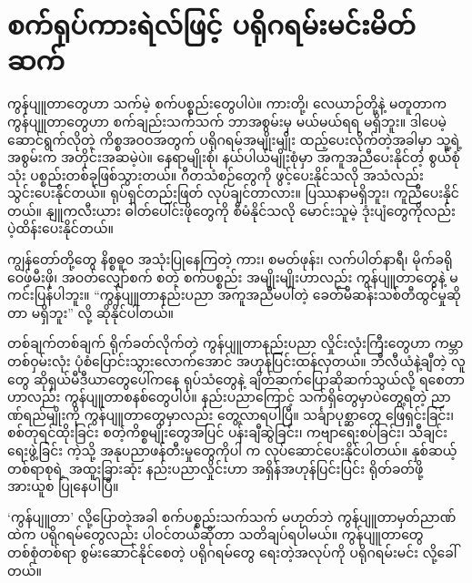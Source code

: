 \chapter{စက်ရုပ်ကားရဲလ်ဖြင့် ပရိုဂရမ်းမင်းမိတ်ဆက်} \label{ch:ch01}
ကွန်ပျူတာတွေဟာ သက်မဲ့ စက်ပစ္စည်းတွေပါပဲ။ ကားတို့၊ လေယာဉ်တို့နဲ့ မတူတာက ကွန်ပျူတာတွေဟာ စက်ချည်းသက်သက် ဘာအစွမ်းမှ မယ်မယ်ရရ မရှိဘူး။ ဒါပေမဲ့ ဆောင်ရွက်လိုတဲ့ ကိစ္စအဝဝအတွက် ပရိုဂရမ်အမျိုးမျိုး ထည့်ပေးလိုက်တဲ့အခါမှာ သူ့ရဲ့အစွမ်းက အတိုင်းအဆမဲ့ပဲ။ နေရာမျိုးစုံ၊ နယ်ပါယ်မျိုးစုံမှာ အကူအညီပေးနိုင်တဲ့ စွယ်စုံသုံး ပစ္စည်းတစ်ခုဖြစ်သွားတယ်။ ဂီတသံစဉ်တွေကို ဖွင့်ပေးနိုင်သလို အသံလည်းသွင်းပေးနိုင်တယ်။ ရုပ်ရှင်တည်းဖြတ် လုပ်ချင်တာလား။ ပြဿနာမရှိဘူး၊ ကူညီပေးနိုင်တယ်။ နျူကလီး\allowbreak ယား ဓါတ်ပေါင်းဖိုတွေကို စီမံနိုင်သလို မောင်းသူမဲ့ ဒုံးပျံတွေကိုလည်း ပဲ့ထိန်းပေးနိုင်တယ်။ 

ကျွန်တော်တို့တွေ နိစ္စဓူဝ အသုံးပြုနေကြတဲ့ ကား၊ စမတ်ဖုန်း၊ လက်ပါတ်နာရီ၊ မိုက်ခရိုဝေဖ့်မီးဖို၊ အဝတ်လျှော်စက် စတဲ့ စက်ပစ္စည်း အမျိုးမျိုးဟာလည်း ကွန်ပျူတာတွေနဲ့ မကင်းပြန်ပါဘူး။ “ကွန်ပျူတာနည်းပညာ အကူအညီမပါတဲ့ ခေတ်မီဆန်းသစ်တီထွင်မှုဆိုတာ မရှိဘူး” လို့ ဆိုနိုင်ပါတယ်။

တစ်ချက်တစ်ချက် ရိုက်ခတ်လိုက်တဲ့ ကွန်ပျူတာနည်းပညာ လှိုင်းလုံးကြီးတွေဟာ ကမ္ဘာတစ်ဝှမ်းလုံး ပုံစံပြောင်းသွားလောက်အောင် အဟုန်ပြင်းထန်လှတယ်။ ဘီလီယံနဲ့ချီတဲ့ လူတွေ ဆိုရှယ်မီဒီယာတွေပေါ်ကနေ ရုပ်သံတွေနဲ့ ချိတ်ဆက်ပြောဆိုဆက်သွယ်လို့ ရစေတာဟာလည်း ကွန်ပျူတာစနစ်တွေပါပဲ။  နည်းပညာကြောင့် သက်ရှိတွေမှာပဲတွေ့ရတဲ့ ညာဏ်ရည်မျိုးကို ကွန်ပျူတာတွေမှာလည်း တွေ့လာရပါပြီ။ သင်္ချာပုစ္ဆာတွေ ဖြေရှင်းခြင်း၊ စစ်တုရင်ထိုးခြင်း စတဲ့ကိစ္စမျိုးတွေအပြင် ပန်းချီဆွဲခြင်း၊ ကဗျာရေးစပ်ခြင်း၊ သီချင်းရေးဖွဲ့ခြင်း ကဲ့သို့ အနုပညာဖန်တီးမှုတွေကိုပါ  က လုပ်ဆောင်ပေးနိုင်ပါတယ်။ နှစ်ဆယ့်တစ်ရာစုရဲ့ အထူးခြားဆုံး  နည်းပညာလှိုင်းဟာ အရှိန်အဟုန်ပြင်းပြင်း ရိုတ်ခတ်ဖို့ အားယူစ ပြုနေပါပြီ။

‘ကွန်ပျူတာ’ လို့ပြောတဲ့အခါ စက်ပစ္စည်းသက်သက် မဟုတ်ဘဲ ကွန်ပျူတာမှတ်ညာဏ်ထဲက ပရိုဂရမ်တွေလည်း ပါဝင်တယ်ဆိုတာ သတိချပ်ရပါမယ်။ ကွန်ပျူတာတွေ တစ်စုံတစ်ရာ စွမ်းဆောင်နိုင်စေတဲ့  ပရိုဂရမ်တွေ ရေးတဲ့အလုပ်ကို ပရိုဂရမ်းမင်း လို့ခေါ်တယ်။

